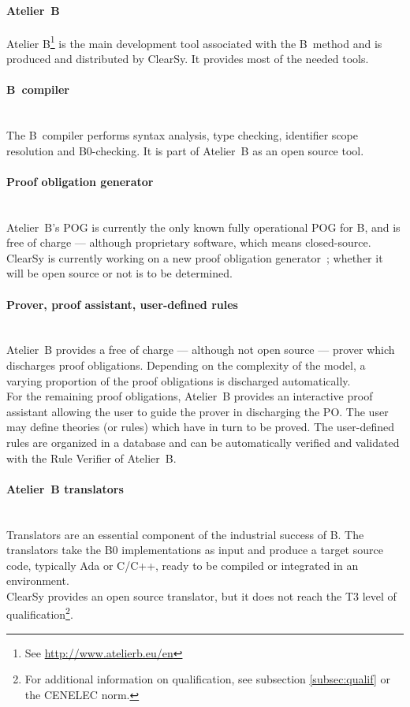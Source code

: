 \paragraph{Atelier~B}
\label{subsec:atelierb}
Atelier B\footnote{See \url{http://www.atelierb.eu/en}} is the main development tool associated with the B~method and is produced and distributed by ClearSy. It provides most of the needed tools.

\paragraph{B~compiler}~\\
The B~compiler performs syntax analysis, type checking, identifier scope resolution and B0-checking. It is part of Atelier~B as an open source tool.

\paragraph{Proof obligation generator}~\\
Atelier~B's POG is currently the only known fully operational POG for B, and is free of charge --- although proprietary software, which means closed-source. ClearSy is currently working on a new proof obligation generator~; whether it will be open source or not is to be determined.

\paragraph{Prover, proof assistant, user-defined rules}~\\
Atelier~B provides a free of charge --- although not open source --- prover which discharges proof obligations. Depending on the complexity of the model, a varying proportion of the proof obligations is discharged automatically.\\
For the remaining proof obligations, Atelier~B provides an interactive proof assistant allowing the user to guide the prover in discharging the PO. The user may define theories (or rules) which have in turn to be proved. The user-defined rules are organized in a database and can be automatically verified and validated with the Rule Verifier of Atelier~B.

\paragraph{Atelier~B translators}~\\
Translators are an essential component of the industrial success of B. The translators take the B0 implementations as input and produce a target source code, typically Ada or C/C++, ready to be compiled or integrated in an environment.\\
ClearSy provides an open source translator, but it does not reach the T3 level of qualification\footnote{For additional information on qualification, see subsection \ref{subsec:qualif} or the CENELEC norm.}.

